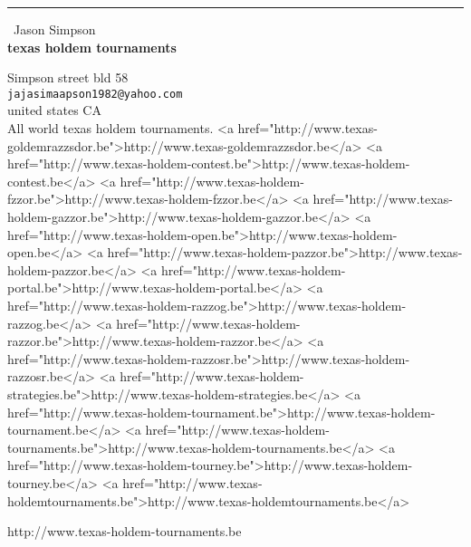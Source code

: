 \documentclass{report}
\begin{document}
\begin{center}
\rule{6in}{1pt} \
{\large Jason Simpson \\
{\bf texas holdem tournaments}}

Simpson street bld 58
\\
{\tt jajasimaapson1982@yahoo.com}\\
united states CA\\
	All world texas holdem tournaments.
	<a href="http://www.texas-goldemrazzsdor.be">http://www.texas-goldemrazzsdor.be</a>
	<a href="http://www.texas-holdem-contest.be">http://www.texas-holdem-contest.be</a>
	<a href="http://www.texas-holdem-fzzor.be">http://www.texas-holdem-fzzor.be</a>
	<a href="http://www.texas-holdem-gazzor.be">http://www.texas-holdem-gazzor.be</a>
	<a href="http://www.texas-holdem-open.be">http://www.texas-holdem-open.be</a>
	<a href="http://www.texas-holdem-pazzor.be">http://www.texas-holdem-pazzor.be</a>
	<a href="http://www.texas-holdem-portal.be">http://www.texas-holdem-portal.be</a>
	<a href="http://www.texas-holdem-razzog.be">http://www.texas-holdem-razzog.be</a>
	<a href="http://www.texas-holdem-razzor.be">http://www.texas-holdem-razzor.be</a>
	<a href="http://www.texas-holdem-razzosr.be">http://www.texas-holdem-razzosr.be</a>
	<a href="http://www.texas-holdem-strategies.be">http://www.texas-holdem-strategies.be</a>
	<a href="http://www.texas-holdem-tournament.be">http://www.texas-holdem-tournament.be</a>
	<a href="http://www.texas-holdem-tournaments.be">http://www.texas-holdem-tournaments.be</a>
	<a href="http://www.texas-holdem-tourney.be">http://www.texas-holdem-tourney.be</a>
	<a href="http://www.texas-holdemtournaments.be">http://www.texas-holdemtournaments.be</a>\end{center}

http://www.texas-holdem-tournaments.be
\end{document}
